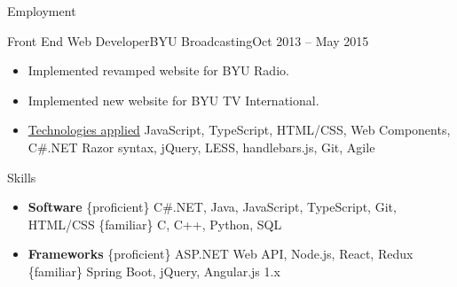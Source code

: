 \documentclass[]{lastcv}
\begin{document}
\begin{cvsection}{Employment}
		\begin{cvsubsection}{Front End Web Developer}{BYU Broadcasting}{Oct 2013 -- May 2015}		
			\begin{itemize}
				\item Implemented revamped website for BYU Radio.
				\item Implemented new website for BYU TV International.
				\item \underline{Technologies applied} JavaScript, TypeScript, HTML/CSS, Web Components, C\#.NET Razor syntax, jQuery, LESS, handlebars.js, Git, Agile
			\end{itemize}
		\end{cvsubsection}
	\end{cvsection}
	
	
	\begin{cvsection}{Skills}
		\begin{cvsubsection}{}{}{}	
			\begin{itemize}
				\item \textbf{Software} \{proficient\} C\#.NET, Java, JavaScript, TypeScript, Git, HTML/CSS \{familiar\} C, C++, Python, SQL 
				\item \textbf{Frameworks} \{proficient\} ASP.NET Web API, Node.js, React, Redux \{familiar\} Spring Boot, jQuery, Angular.js 1.x
			\end{itemize}
		\end{cvsubsection}
	\end{cvsection}
\end{document}
